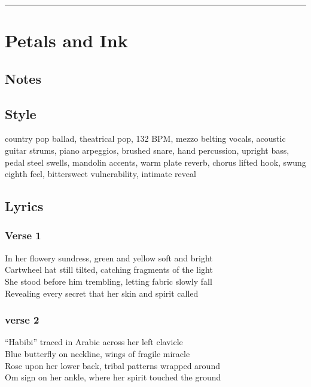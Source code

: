 \documentclass[]{article}
\begin{document}
\begin{center}\rule{0.5\linewidth}{0.5pt}\end{center}

\section{Petals and Ink}\label{petals-and-ink}

\subsection{Notes}\label{notes-45}

\subsection{Style}\label{style-45}

country pop ballad, theatrical pop, 132 BPM, mezzo belting vocals,
acoustic guitar strums, piano arpeggios, brushed snare, hand percussion,
upright bass, pedal steel swells, mandolin accents, warm plate reverb,
chorus lifted hook, swung eighth feel, bittersweet vulnerability,
intimate reveal

\subsection{Lyrics}\label{lyrics-45}

\subsubsection{Verse 1}\label{verse-1-28}

In her flowery sundress, green and yellow soft and bright\\
Cartwheel hat still tilted, catching fragments of the light\\
She stood before him trembling, letting fabric slowly fall\\
Revealing every secret that her skin and spirit called

\subsubsection{verse 2}\label{verse-2-23}

``Habibi'' traced in Arabic across her left clavicle\\
Blue butterfly on neckline, wings of fragile miracle\\
Rose upon her lower back, tribal patterns wrapped around\\
Om sign on her ankle, where her spirit touched the ground
\end{document}
